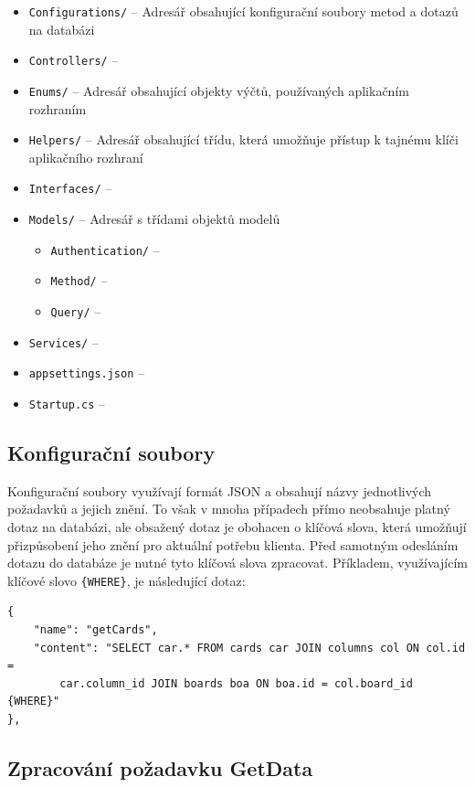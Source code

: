 \begin{itemize}
  \item \texttt{Configurations/} -- Adresář obsahující konfigurační soubory metod a dotazů na databázi
  \item \texttt{Controllers/} -- 
  \item \texttt{Enums/} -- Adresář obsahující objekty výčtů, používaných aplikačním rozhraním
  \item \texttt{Helpers/} -- Adresář obsahující třídu, která umožňuje přístup k tajnému klíči aplikačního rozhraní
  \item \texttt{Interfaces/} -- %
  \item \texttt{Models/} -- Adresář s třídami objektů modelů
  \begin{itemize}
    \item \texttt{Authentication/} -- 
    \item \texttt{Method/} -- 
    \item \texttt{Query/} -- 
  \end{itemize}
  \item \texttt{Services/} -- 
  \item \texttt{appsettings.json} -- 
  \item \texttt{Startup.cs} -- 
\end{itemize}


\subsection{Konfigurační soubory}
Konfigurační soubory využívají formát JSON a obsahují názvy jednotlivých požadavků a jejich znění. To však v mnoha případech přímo neobsahuje platný dotaz na databázi, ale obsažený dotaz je obohacen o klíčová slova, která umožňují přizpůsobení jeho znění pro aktuální potřebu klienta. Před samotným odesláním dotazu do databáze je nutné tyto klíčová slova zpracovat. Příkladem, využívajícím klíčové slovo \texttt{\{WHERE\}}, je následující dotaz:
\begin{verbatim}
{
    "name": "getCards",
    "content": "SELECT car.* FROM cards car JOIN columns col ON col.id = 
        car.column_id JOIN boards boa ON boa.id = col.board_id {WHERE}"
},
\end{verbatim}


\subsection{Zpracování požadavku GetData}
\blindtext


